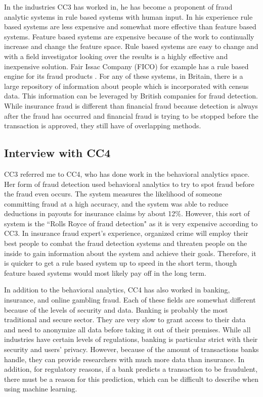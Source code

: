 \documentclass[midd]{thesis}
\begin{document}
In the industries CC3 has worked in, he has become a proponent of fraud analytic systems in rule based systems with human input. In his experience rule based systems are less expensive and somewhat more effective than feature based systems. Feature based systems are expensive because of the work to continually increase and change the feature space. Rule based systems are easy to change and with a field investigator looking over the results is a highly effective and inexpensive solution. Fair Issac Company (FICO) for example has a rule based engine for its fraud products \cite{FICO}. For any of these systems, in Britain, there is a large repository of information about people which is incorporated with census data. This information can be leveraged by British companies for fraud detection. While insurance fraud is different than financial fraud because detection is always after the fraud has occurred and financial fraud is trying to be stopped before the transaction is approved, they still have of overlapping methods.

\subsection{Interview with CC4}

CC3 referred me to CC4, who has done work in the behavioral analytics space. Her form of fraud detection used behavioral analytics to try to spot fraud before the fraud even occurs. The system measures the likelihood of someone committing fraud at a high accuracy, and the system was able to reduce deductions in payouts for insurance claims by about 12\%. However, this sort of system is the ``Rolls Royce of fraud detection" as it is very expensive according to CC3. In insurance fraud expert's experience, organized crime will employ their best people to combat the fraud detection systems and threaten people on the inside to gain information about the system and achieve their goals. Therefore, it is quicker to get a rule based system up to speed in the short term, though feature based systems would most likely pay off in the long term.

In addition to the behavioral analytics, CC4 has also worked in banking, insurance, and online gambling fraud. Each of these fields are somewhat different because of the levels of security and data. Banking is probably the most traditional and secure sector. They are very slow to grant access to their data and need to anonymize all data before taking it out of their premises. While all industries have certain levels of regulations, banking is particular strict with their security and users' privacy. However, because of the amount of transactions banks handle, they can provide researchers with much more data than insurance. In addition, for regulatory reasons, if a bank predicts a transaction to be fraudulent, there must be a reason for this prediction, which can be difficult to describe when using machine learning. 
\end{document}
